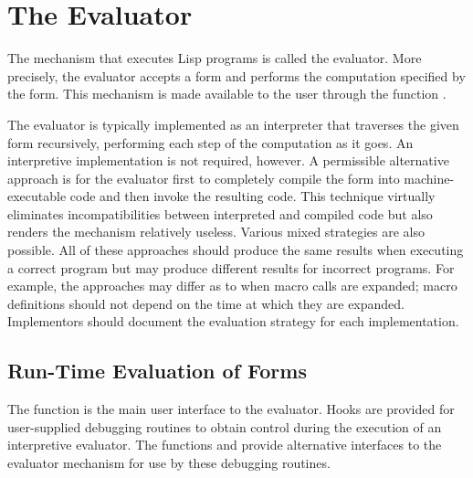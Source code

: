 
\clearpage\def\pagestatus{FINAL PROOF}

\chapter{The Evaluator}


The mechanism that executes Lisp programs is called the evaluator.
More precisely, the evaluator accepts a form and performs the
computation specified by the form.  This mechanism is made available
to the user through the function .

The evaluator is typically implemented as an interpreter
that traverses the given form recursively, performing each step
of the computation as it goes.  An interpretive implementation is not
required, however.  A permissible alternative approach is
for the evaluator first to completely compile the form into
machine-executable code and then invoke the resulting code.
This technique virtually eliminates incompatibilities
between interpreted and compiled code but also renders the 
mechanism relatively useless.
Various mixed strategies are also possible.  All of these approaches
should produce the same results when executing a correct program
but may produce different results for incorrect programs.
For example, the approaches may differ as to when macro calls
are expanded; macro definitions should not depend on the time
at which they are expanded.  Implementors should
document the evaluation strategy for each implementation.

\section{Run-Time Evaluation of Forms}

The function  is the main user interface to the evaluator.
Hooks are provided for user-supplied debugging routines
to obtain control during the execution of an interpretive evaluator.
The functions  and  provide alternative
interfaces to the evaluator mechanism for use by these debugging routines.

